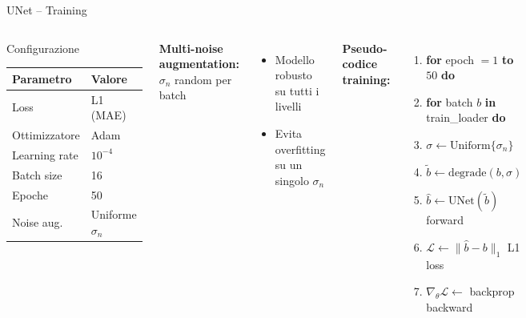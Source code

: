 \documentclass[italian,10pt]{beamer}
\begin{document}
\begin{frame}{UNet -- Training}
  \begin{columns}
      \begin{block}{Configurazione}
        \begin{tabular}{ll}\toprule
          \textbf{Parametro} & \textbf{Valore}\\\midrule
          Loss & L1 (MAE)\\
          Ottimizzatore & Adam\\
          Learning rate & $10^{-4}$\\
          Batch size & 16\\
          Epoche & 50\\
          Noise aug. & Uniforme $\sigma_n$\\\bottomrule
        \end{tabular}
      \end{block}
      \vspace{0.2cm}
      \textbf{Multi-noise augmentation:}
      $\sigma_n$ random per batch
      \begin{itemize}
        \item Modello robusto su tutti i livelli
        \item Evita overfitting su un singolo $\sigma_n$
      \end{itemize}
      \small
      \textbf{Pseudo-codice training:}
      \vspace{0.15cm}
      \begin{enumerate}
        \item \textbf{for} epoch $=1$ \textbf{to} $50$ \textbf{do}
        \item \hspace{0.5cm}\textbf{for} batch $b$ \textbf{in} train\_loader \textbf{do}
        \item \hspace{1.0cm}$\sigma \gets \text{Uniform}\{\sigma_n\}$
        \item \hspace{1.0cm}$\tilde{b} \gets \text{degrade}(b, \sigma)$
        \item \hspace{1.0cm}$\hat{b} \gets \text{UNet}(\tilde{b})$ \hfill\tiny forward
        \item \hspace{1.0cm}$\mathcal{L} \gets \|\hat{b} - b\|_1$ \hfill\tiny L1 loss
        \item \hspace{1.0cm}$\nabla_\theta\mathcal{L} \gets$ backprop \hfill\tiny backward

\end{enumerate}
\end{columns}
\end{frame}
\end{document}
